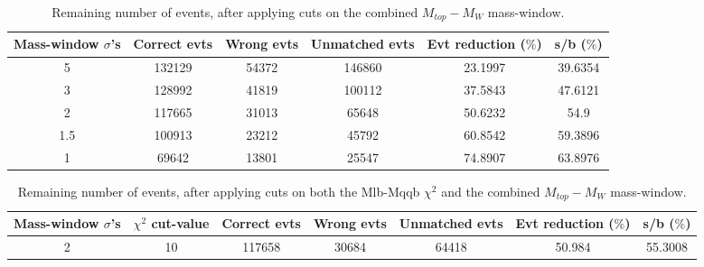 \documentclass{article}
\begin{document}
 \begin{table}[h!t] 
  \caption{Remaining number of events, after applying cuts on the combined $M_{top}-M_{W}$ mass-window.} 
  \centering 
   \begin{tabular}{c|c|c|c|c|c} 
     Mass-window $\sigma$'s & Correct evts    & Wrong evts     & Unmatched evts  & Evt reduction ($\%$)   & s/b ($\%$)     \\ 
     \hline
     5 & 132129  &  54372  &  146860  &  23.1997 &  39.6354 \\ 
     3 & 128992  &  41819  &  100112  &  37.5843 &  47.6121 \\ 
     2 & 117665  &  31013  &  65648  &  50.6232 &  54.9 \\ 
     1.5 & 100913  &  23212  &  45792  &  60.8542 &  59.3896 \\ 
     1 & 69642  &  13801  &  25547  &  74.8907 &  63.8976   \end{tabular} 
 \end{table} 
 
 \begin{table}[h!t] 
  \caption{Remaining number of events, after applying cuts on both the Mlb-Mqqb $\chi^{2}$ and the combined $M_{top}-M_{W}$ mass-window.} 
  \centering 

   \begin{tabular}{c|c|c|c|c|c|c}
    Mass-window $\sigma$'s & $\chi^{2}$ cut-value   & Correct evts   & Wrong evts    & Unmatched evts & Evt reduction ($\%$)   & s/b ($\%$)    \\
     \hline
     2 & 10 & 117658 & 30684 & 64418 & 50.984 & 55.3008
   \end{tabular} 
 \end{table} 
 
\end{document}
